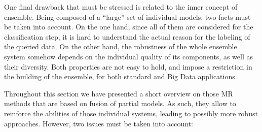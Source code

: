 \documentclass[3p,review]{elsarticle}
\begin{document}
	One final drawback that must be stressed is related to the inner concept of ensemble. Being composed of a ``large'' set of individual models, two facts must be taken into account. On the one hand, since all of them are considered for the classification step, it is hard to understand the actual reason for the labeling of the queried data. On the other hand, the robustness of the whole ensemble system somehow depends on the individual quality of its components, as well as their diversity. Both properties are not easy to hold, and impose a restriction in the building of the ensemble, for both standard and Big Data applications.
	
	
	
	
	
	
	
	Throughout this section we have presented a short overview on those MR methods that are based on fusion of partial models. As such, they allow to reinforce the abilities of those individual systems, leading to possibly more robust approaches. However, two issues must be taken into account:
	
\end{document}
